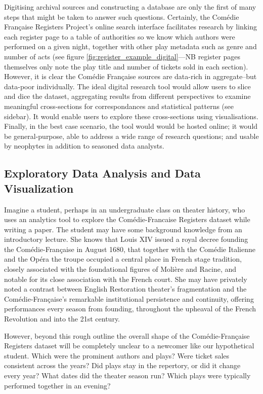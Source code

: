 \documentclass[	DIV=calc,%
							paper=a4,%
							fontsize=11pt,%
							twocolumn]{scrartcl}	 					%
\begin{document}
Digitising archival sources and constructing a database are only the first of many steps that might be taken to answer such questions.  Certainly, the Comédie Française Registers Project's online search interface facilitates research by linking each register page to a table of authorities so we know which authors were performed on a given night, together with other play metadata such as genre and number of acts (see figure \ref{fig:register_example_digital}---NB register pages themselves only note the play title and number of tickets sold in each section). However, it is clear the Comédie Française sources are data-rich in aggregate--but data-poor individually.  The ideal digital research tool would allow users to slice and dice the dataset, aggregating results from different perspectives to examine meaningful cross-sections for correspondances and statistical patterns (see sidebar).  It would enable users to explore these cross-sections using visualisations. Finally, in the best case scenario, the tool would would be hosted online; it would be general-purpose, able to address a wide range of research questions; and usable by neophytes in addition to seasoned data analysts.

\subsection*{Exploratory Data Analysis and Data Visualization}

Imagine a student, perhaps in an undergraduate class on theater history, who uses an analytics tool to explore the Comédie-Francaise Registers dataset while writing a paper. The student may have some background knowledge from an introductory lecture.  She knows that Louis XIV issued a royal decree founding the Comédie-Française in August 1680, that together with the Comédie Italienne and the Opéra the troupe occupied a central place in French stage tradition, closely associated with the foundational figures of Molière and Racine, and notable for its close association with the French court.  She may have privately noted a contrast between English Restoration theater’s fragmentation and the Comédie-Française’s remarkable institutional persistence and continuity, offering performances every season from founding, throughout the upheaval of the French Revolution and into the 21st century.

However, beyond this rough outline the overall shape of the Comédie-Française Registers dataset will be completely unclear to a newcomer like our hypothetical student.  Which were the prominent authors and plays? Were ticket sales consistent across the years?  Did plays stay in the repertory, or did it change every year?  What dates did the theater season run?  Which plays were typically performed together in an evening?
\end{document}
